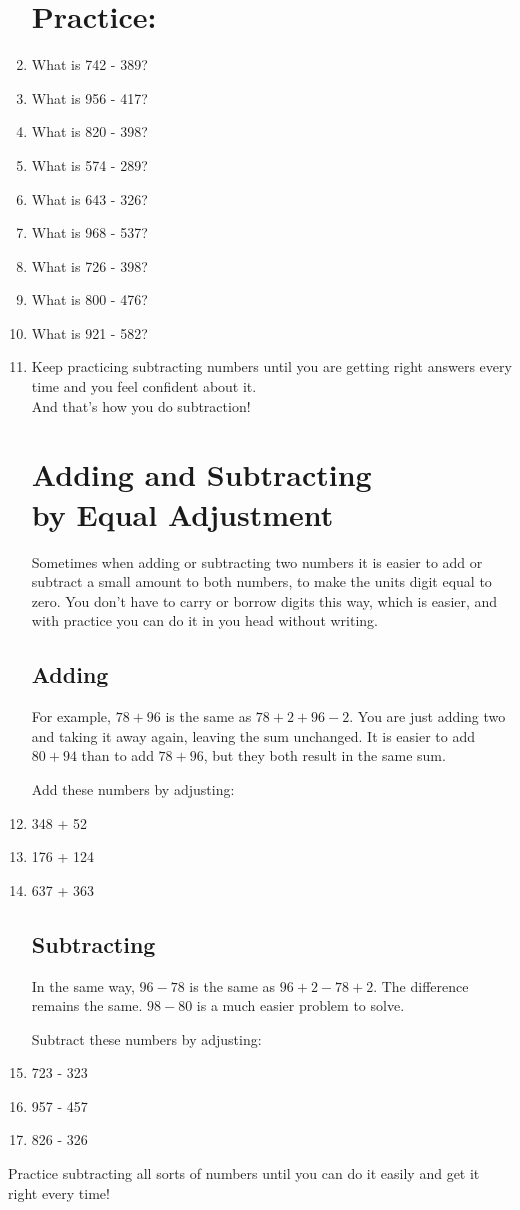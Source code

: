 \documentclass[12pt]{article}
\begin{document}
\begin{enumerate}
\section*{Practice:}

\item What is 742 - 389?
\item What is 956 - 417?
\item What is 820 - 398?
\item What is 574 - 289?
\item What is 643 - 326?
\item What is 968 - 537?
\item What is 726 - 398?
\item What is 800 - 476?
\item What is 921 - 582?
\item Keep practicing subtracting numbers until you are getting right answers every time and you feel confident about it.\\

And that's how you do subtraction!

\newpage

\section*{Adding and Subtracting\\by Equal Adjustment}
Sometimes when adding or subtracting two numbers it is easier to add or subtract a small amount to both numbers, to make the units digit equal to zero. You don't have to carry or borrow digits this way, which is easier, and with practice you can do it in you head without writing.\\

\subsection*{Adding}
For example, $78 + 96$ is the same as $78 + 2 + 96 - 2$. You are just adding two and taking it away again, leaving the sum unchanged. It is easier to add $80 + 94$ than to add $78 + 96$, but they both result in the same sum.

Add these numbers by adjusting:
\item 348 + 52
\item 176 + 124
\item 637 + 363

\subsection*{Subtracting}
In the same way, $96 - 78$ is the same as $96 + 2 - 78 + 2$. The difference remains the same. $98 - 80$ is a much easier problem to solve.

Subtract these numbers by adjusting:
\item 723 - 323
\item 957 - 457
\item 826 - 326

\end{enumerate}

Practice subtracting all sorts of numbers until you can do it easily and get it right every time!
\end{document}
